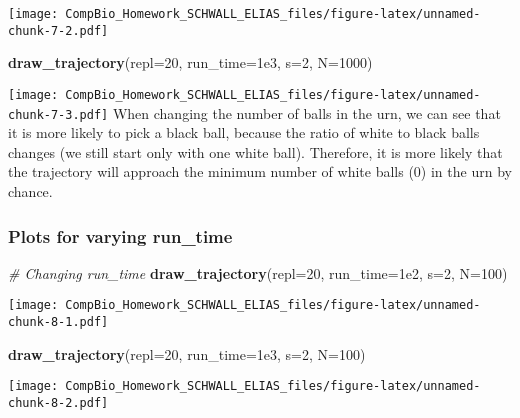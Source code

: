 \documentclass[
]{article}
\newenvironment{Shaded}{\begin{snugshade}}{\end{snugshade}}
\newcommand{\AttributeTok}[1]{\textcolor[rgb]{0.13,0.29,0.53}{#1}}
\newcommand{\CommentTok}[1]{\textcolor[rgb]{0.56,0.35,0.01}{\textit{#1}}}
\newcommand{\DecValTok}[1]{\textcolor[rgb]{0.00,0.00,0.81}{#1}}
\newcommand{\FloatTok}[1]{\textcolor[rgb]{0.00,0.00,0.81}{#1}}
\newcommand{\FunctionTok}[1]{\textcolor[rgb]{0.13,0.29,0.53}{\textbf{#1}}}
\newcommand{\NormalTok}[1]{#1}
\begin{document}
\texttt{[image: CompBio\_Homework\_SCHWALL\_ELIAS\_files/figure-latex/unnamed-chunk-7-2.pdf]}

\begin{Shaded}
\begin{Highlighting}[]
\FunctionTok{draw\_trajectory}\NormalTok{(}\AttributeTok{repl=}\DecValTok{20}\NormalTok{, }\AttributeTok{run\_time=}\FloatTok{1e3}\NormalTok{, }\AttributeTok{s=}\DecValTok{2}\NormalTok{, }\AttributeTok{N=}\DecValTok{1000}\NormalTok{)}
\end{Highlighting}
\end{Shaded}

\texttt{[image: CompBio\_Homework\_SCHWALL\_ELIAS\_files/figure-latex/unnamed-chunk-7-3.pdf]}
When changing the number of balls in the urn, we can see that it is more
likely to pick a black ball, because the ratio of white to black balls
changes (we still start only with one white ball). Therefore, it is more
likely that the trajectory will approach the minimum number of white
balls (0) in the urn by chance. \newpage

\hypertarget{plots-for-varying-run_time}{%
\subsubsection{Plots for varying
run\_time}\label{plots-for-varying-run_time}}

\begin{Shaded}
\begin{Highlighting}[]
\CommentTok{\# Changing run\_time}
\FunctionTok{draw\_trajectory}\NormalTok{(}\AttributeTok{repl=}\DecValTok{20}\NormalTok{, }\AttributeTok{run\_time=}\FloatTok{1e2}\NormalTok{, }\AttributeTok{s=}\DecValTok{2}\NormalTok{, }\AttributeTok{N=}\DecValTok{100}\NormalTok{)}
\end{Highlighting}
\end{Shaded}

\texttt{[image: CompBio\_Homework\_SCHWALL\_ELIAS\_files/figure-latex/unnamed-chunk-8-1.pdf]}

\begin{Shaded}
\begin{Highlighting}[]
\FunctionTok{draw\_trajectory}\NormalTok{(}\AttributeTok{repl=}\DecValTok{20}\NormalTok{, }\AttributeTok{run\_time=}\FloatTok{1e3}\NormalTok{, }\AttributeTok{s=}\DecValTok{2}\NormalTok{, }\AttributeTok{N=}\DecValTok{100}\NormalTok{)}
\end{Highlighting}
\end{Shaded}

\texttt{[image: CompBio\_Homework\_SCHWALL\_ELIAS\_files/figure-latex/unnamed-chunk-8-2.pdf]}
\end{document}

